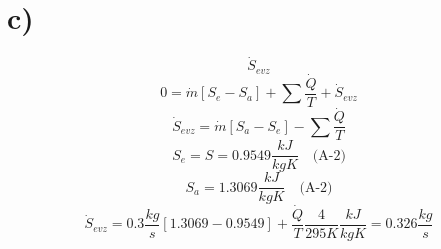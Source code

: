 

\section*{c)}
\[
\dot{S}_{evz}
\]
\[
0 = \dot{m} [S_e - S_a] + \sum \frac{\dot{Q}}{T} + \dot{S}_{evz}
\]
\[
\dot{S}_{evz} = \dot{m} [S_a - S_e] - \sum \frac{\dot{Q}}{T}
\]
\[
S_e = S = 0.9549 \frac{kJ}{kgK} \quad \text{(A-2)}
\]
\[
S_a = 1.3069 \frac{kJ}{kgK} \quad \text{(A-2)}
\]
\[
\dot{S}_{evz} = 0.3 \frac{kg}{s} \left[ 1.3069 - 0.9549 \right] + \frac{\dot{Q}}{T} \frac{4}{295K} \frac{kJ}{kgK} = 0.326 \frac{kg}{s}
\]
